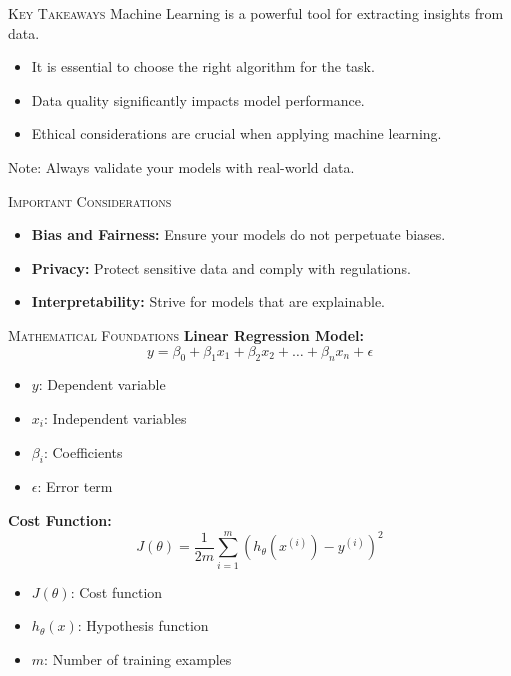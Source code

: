 \documentclass[compress]{beamer}
\newcommand{\highlight}[1]{\colorbox{yellow!50}{#1}}
\newcommand{\notehighlight}[1]{\colorbox{pink!50}{#1}}
\newcommand{\custombox}[2]{\begin{tcolorbox}[colback=#1!5!white, colframe=#1!75!black]
#2
\end{tcolorbox}}
\begin{document}
\begin{frame}{\textsc{Key Takeaways}}
  \highlight{Machine Learning} is a powerful tool for extracting insights from data.

  \begin{itemize}
    \item It is essential to choose the right algorithm for the task.
    \item Data quality significantly impacts model performance.
    \item Ethical considerations are crucial when applying machine learning.
  \end{itemize}

  \notehighlight{Note:} Always validate your models with real-world data.
\end{frame}

\begin{frame}{\textsc{Important Considerations}}
  \custombox{Rich_Red}{
    \begin{itemize}
      \item \textbf{Bias and Fairness:} Ensure your models do not perpetuate biases.
      \item \textbf{Privacy:} Protect sensitive data and comply with regulations.
      \item \textbf{Interpretability:} Strive for models that are explainable.
    \end{itemize}
  }
\end{frame}

\begin{frame}{\textsc{Mathematical Foundations}}
  \textbf{Linear Regression Model:}
  \begin{equation}
    y = \beta_0 + \beta_1 x_1 + \beta_2 x_2 + \dots + \beta_n x_n + \epsilon
  \end{equation}
  \begin{itemize}
    \item $y$: Dependent variable
    \item $x_i$: Independent variables
    \item $\beta_i$: Coefficients
    \item $\epsilon$: Error term
  \end{itemize}

  \textbf{Cost Function:}
  \begin{equation}
    J(\theta) = \frac{1}{2m} \sum_{i=1}^{m} (h_{\theta}(x^{(i)}) - y^{(i)})^2
  \end{equation}
  \begin{itemize}
    \item $J(\theta)$: Cost function
    \item $h_{\theta}(x)$: Hypothesis function
    \item $m$: Number of training examples
  \end{itemize}
\end{frame}
\end{document}
